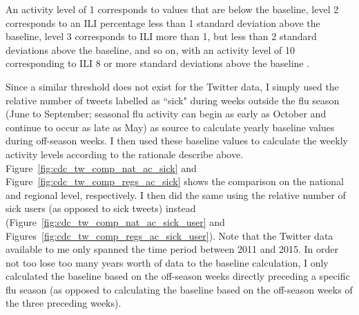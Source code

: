 \documentclass[11pt, a4paper,twoside]{report}\usepackage[]{graphicx}\usepackage[]{color}
\begin{document}
An activity level of 1 corresponds to values that are below the baseline, level 2 corresponds to an ILI percentage less than 1 standard deviation above the baseline, level 3 corresponds to ILI more than 1, but less than 2 standard deviations above the baseline, and so on, with an activity level of 10 corresponding to ILI 8 or more standard deviations above the baseline \citep{cdc_surveillance_2016}.
  
Since a similar threshold does not exist for the Twitter data, I simply used the relative number of tweets labelled as ``sick" during weeks outside the flu season (June to September; seasonal flu activity can begin as early as October and continue to occur as late as May) as source to calculate yearly baseline values during off-season weeks. I then used these baseline values to calculate the weekly activity levels according to the rationale describe above. Figure~\ref{fig:cdc_tw_comp_nat_ac_sick} and Figure~\ref{fig:cdc_tw_comp_regs_ac_sick} shows the comparison on the national and regional level, respectively. I then did the same using the relative number of sick users (as opposed to sick tweets) instead (Figure~\ref{fig:cdc_tw_comp_nat_ac_sick_user} and Figures~\ref{fig:cdc_tw_comp_regs_ac_sick_user}). Note that the Twitter data available to me only spanned the time period between 2011 and 2015. In order not too lose too many years worth of data to the baseline calculation, I only calculated the baseline based on the off-season weeks directly preceding a specific flu season (as opposed to calculating the baseline based on the off-season weeks of the three preceding weeks).\newpage
\end{document}
